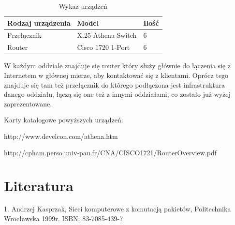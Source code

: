 \documentclass[a4paper]{article}
\begin{document}
\begin{table}[H]
	\centering
	\caption{Wykaz urządzeń}
	\begin{tabular}{lll}
		\hline
        Rodzaj urządzenia & Model & Ilość \\
        \hline
        Przełącznik & X.25 Athena Switch & 6 \\
        Router & Cisco 1720 1-Port & 6 \\
        \hline
	\end{tabular}	
\end{table}

W każdym oddziale znajduje się router który służy głównie do łączenia się z Internetem w głównej mierze, aby kontaktować się z klientami. Oprócz tego znajduje się tam też przełącznik do którego podłączona jest infrastruktura danego oddziału, łączą się one też z innymi oddziałami, co zostało już wyżej zaprezentowane.


Karty katalogowe powyższych urządzeń:

http://www.develcon.com/athena.htm

http://cpham.perso.univ-pau.fr/CNA/CISCO1721/RouterOverview.pdf

\section{Literatura}

1. Andrzej Kasprzak, Sieci komputerowe z komutacją pakietów, Politechnika Wrocławska 1999r. ISBN: 83-7085-439-7
\end{document}
